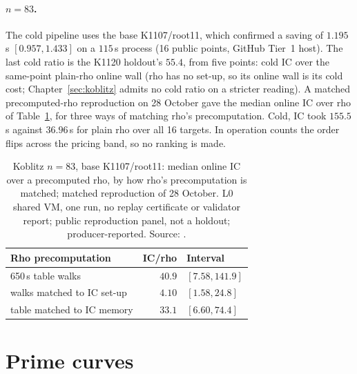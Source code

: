 \paragraph{$n=83$.} The cold pipeline uses the base K1107/root11, which
confirmed a saving of $1.195$\,s $[0.957,1.433]$ on a $115$\,s process (16
public points, GitHub Tier~1 host). The last cold ratio is the K1120
holdout's $55.4$, from five points: cold IC over the same-point plain-rho
online wall (rho has no set-up, so its online wall is its cold cost;
Chapter~\ref{sec:koblitz} admits no cold ratio on a stricter reading). A matched precomputed-rho
reproduction on 28 October gave the median online IC over rho of
Table~\ref{tab:distance-n83}, for three ways of matching rho's
precomputation. Cold, IC took $155.5$\,s against $36.96$\,s for plain rho over all 16
targets. In operation counts the order flips across the pricing band, so
no ranking is made.

\begin{table}[t]
\centering\small
\begin{tabular}{@{}lrl@{}}
\toprule
Rho precomputation & IC/rho & Interval \\
\midrule
650\,s table walks & $40.9$ & $[7.58,141.9]$ \\
walks matched to IC set-up & $4.10$ & $[1.58,24.8]$ \\
table matched to IC memory & $33.1$ & $[6.60,74.4]$ \\
\bottomrule
\end{tabular}
\caption[]{Koblitz $n=83$, base K1107/root11: median online IC over a
precomputed rho, by how rho's precomputation is matched; matched
reproduction of 28 October. L0 shared VM, one run, no replay certificate or
validator report; public reproduction panel, not a holdout;
producer-reported. Source:
.}
\label{tab:distance-n83}
\end{table}

\section{Prime curves}

